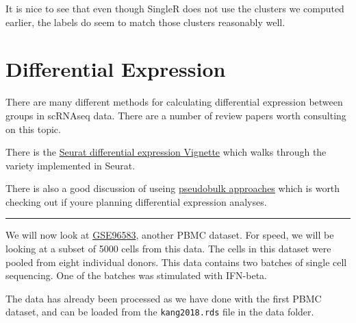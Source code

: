 \documentclass[
]{book}
\begin{document}
It is nice to see that even though SingleR does not use the clusters we computed earlier, the labels do seem to match those clusters reasonably well.

\hypertarget{de2}{%
\chapter{Differential Expression}\label{de2}}

There are many different methods for calculating differential expression between groups in scRNAseq data. There are a number of review papers worth consulting on this topic.

There is the \href{https://satijalab.org/seurat/archive/v3.1/de_vignette.html}{Seurat differential expression Vignette} which walks through the variety implemented in Seurat.

There is also a good discussion of useing \href{http://bioconductor.org/books/3.15/OSCA.multisample/multi-sample-comparisons.html\#creating-pseudo-bulk-samples}{pseudobulk approaches} which is worth checking out if youre planning differential expression analyses.

\begin{center}\rule{0.5\linewidth}{0.5pt}\end{center}

We will now look at \href{https://www.ncbi.nlm.nih.gov/geo/query/acc.cgi?acc=GSE96583}{GSE96583}, another PBMC dataset. For speed, we will be looking at a subset of 5000 cells from this data. The cells in this dataset were pooled from eight individual donors. This data contains two batches of single cell sequencing. One of the batches was stimulated with IFN-beta.

The data has already been processed as we have done with the first PBMC dataset, and can be loaded from the \texttt{kang2018.rds} file in the data folder.
\end{document}
